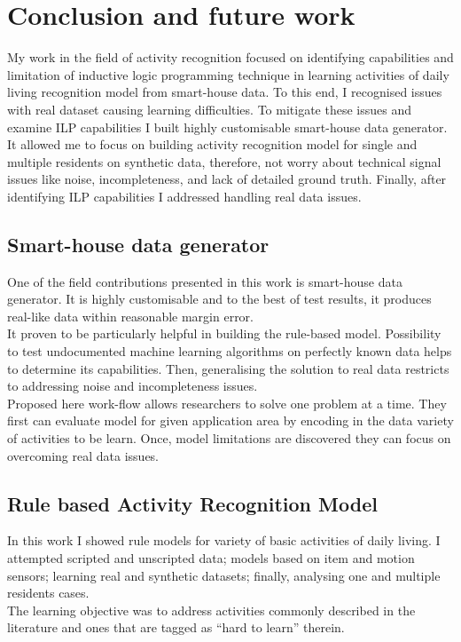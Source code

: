 \documentclass[11pt, a4paper, pdflatex, leqno, twoside, openright]{report}
\begin{document}
\chapter{Conclusion and future work\label{ch:summary}}
My work in the field of activity recognition focused on identifying capabilities and limitation of inductive logic programming technique in learning activities of daily living recognition model from smart-house data. To this end, I recognised issues with real dataset causing learning difficulties. To mitigate these issues and examine ILP capabilities I built highly customisable smart-house data generator. It allowed me to focus on building activity recognition model for single and multiple residents on synthetic data, therefore, not worry about technical signal issues like noise, incompleteness, and lack of detailed ground truth. Finally, after identifying ILP capabilities I addressed handling real data issues.

  \section{Smart-house data generator} %
One of the field contributions presented in this work is smart-house data generator. It is highly customisable and to the best of test results, it produces real-like data within reasonable margin error.\\
It proven to be particularly helpful in building the rule-based model. Possibility to test undocumented machine learning algorithms on perfectly known data helps to determine its capabilities. Then, generalising the solution to real data restricts to addressing noise and incompleteness issues.\\

Proposed here work-flow allows researchers to solve one problem at a time. They first can evaluate model for given application area by encoding in the data variety of activities to be learn. Once, model limitations are discovered they can focus on overcoming real data issues.

  \section{Rule based Activity Recognition Model}
In this work I showed rule models for variety of basic activities of daily living. I attempted scripted and unscripted data; models based on item and motion sensors; learning real and synthetic datasets; finally, analysing one and multiple residents cases.\\
The learning objective was to address activities commonly described in the literature and ones that are tagged as ``hard to learn'' therein.\\
\end{document}
